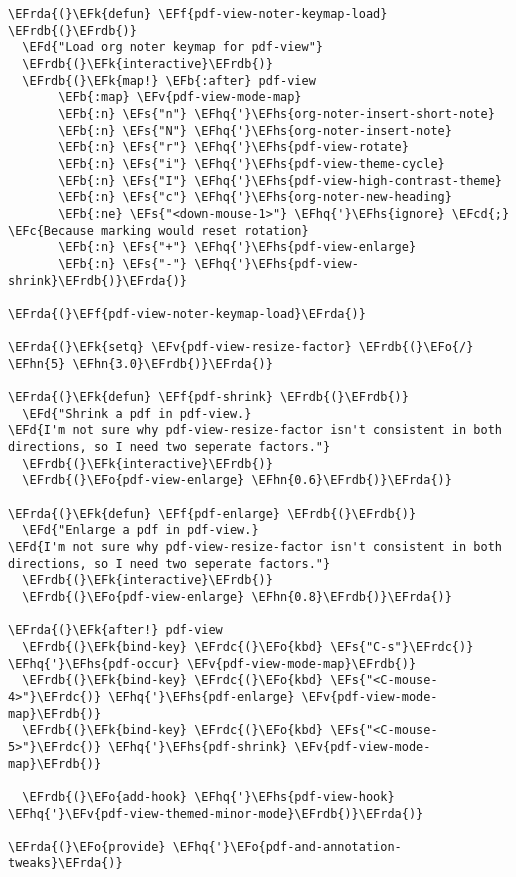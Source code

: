 \documentclass[a4wide,10pt]{article}
\newcommand{\EFc}[1]{\textcolor{EFc}{#1}} %
\newcommand{\EFcd}[1]{\textcolor{EFcd}{#1}} %
\newcommand{\EFs}[1]{\textcolor{EFs}{#1}} %
\newcommand{\EFd}[1]{\textcolor{EFd}{#1}} %
\newcommand{\EFk}[1]{\textcolor{EFk}{#1}} %
\newcommand{\EFb}[1]{\textcolor{EFb}{#1}} %
\newcommand{\EFf}[1]{\textcolor{EFf}{#1}} %
\newcommand{\EFv}[1]{\textcolor{EFv}{#1}} %
\newcommand{\EFo}[1]{\textcolor{EFo}{#1}} %
\newcommand{\EFhn}[1]{\textcolor{EFhn}{\textbf{#1}}} %
\newcommand{\EFhq}[1]{\textcolor{EFhq}{#1}} %
\newcommand{\EFhs}[1]{\textcolor{EFhs}{#1}} %
\newcommand{\EFrda}[1]{\textcolor{EFrda}{#1}} %
\newcommand{\EFrdb}[1]{\textcolor{EFrdb}{#1}} %
\newcommand{\EFrdc}[1]{\textcolor{EFrdc}{#1}} %
\begin{document}
\begin{Code}
\begin{Verbatim}
\EFrda{(}\EFk{defun} \EFf{pdf-view-noter-keymap-load} \EFrdb{(}\EFrdb{)}
  \EFd{"Load org noter keymap for pdf-view"}
  \EFrdb{(}\EFk{interactive}\EFrdb{)}
  \EFrdb{(}\EFk{map!} \EFb{:after} pdf-view
       \EFb{:map} \EFv{pdf-view-mode-map}
       \EFb{:n} \EFs{"n"} \EFhq{'}\EFhs{org-noter-insert-short-note}
       \EFb{:n} \EFs{"N"} \EFhq{'}\EFhs{org-noter-insert-note}
       \EFb{:n} \EFs{"r"} \EFhq{'}\EFhs{pdf-view-rotate}
       \EFb{:n} \EFs{"i"} \EFhq{'}\EFhs{pdf-view-theme-cycle}
       \EFb{:n} \EFs{"I"} \EFhq{'}\EFhs{pdf-view-high-contrast-theme}
       \EFb{:n} \EFs{"c"} \EFhq{'}\EFhs{org-noter-new-heading}
       \EFb{:ne} \EFs{"<down-mouse-1>"} \EFhq{'}\EFhs{ignore} \EFcd{;} \EFc{Because marking would reset rotation}
       \EFb{:n} \EFs{"+"} \EFhq{'}\EFhs{pdf-view-enlarge}
       \EFb{:n} \EFs{"-"} \EFhq{'}\EFhs{pdf-view-shrink}\EFrdb{)}\EFrda{)}

\EFrda{(}\EFf{pdf-view-noter-keymap-load}\EFrda{)}

\EFrda{(}\EFk{setq} \EFv{pdf-view-resize-factor} \EFrdb{(}\EFo{/} \EFhn{5} \EFhn{3.0}\EFrdb{)}\EFrda{)}

\EFrda{(}\EFk{defun} \EFf{pdf-shrink} \EFrdb{(}\EFrdb{)}
  \EFd{"Shrink a pdf in pdf-view.}
\EFd{I'm not sure why pdf-view-resize-factor isn't consistent in both directions, so I need two seperate factors."}
  \EFrdb{(}\EFk{interactive}\EFrdb{)}
  \EFrdb{(}\EFo{pdf-view-enlarge} \EFhn{0.6}\EFrdb{)}\EFrda{)}

\EFrda{(}\EFk{defun} \EFf{pdf-enlarge} \EFrdb{(}\EFrdb{)}
  \EFd{"Enlarge a pdf in pdf-view.}
\EFd{I'm not sure why pdf-view-resize-factor isn't consistent in both directions, so I need two seperate factors."}
  \EFrdb{(}\EFk{interactive}\EFrdb{)}
  \EFrdb{(}\EFo{pdf-view-enlarge} \EFhn{0.8}\EFrdb{)}\EFrda{)}

\EFrda{(}\EFk{after!} pdf-view
  \EFrdb{(}\EFk{bind-key} \EFrdc{(}\EFo{kbd} \EFs{"C-s"}\EFrdc{)} \EFhq{'}\EFhs{pdf-occur} \EFv{pdf-view-mode-map}\EFrdb{)}
  \EFrdb{(}\EFk{bind-key} \EFrdc{(}\EFo{kbd} \EFs{"<C-mouse-4>"}\EFrdc{)} \EFhq{'}\EFhs{pdf-enlarge} \EFv{pdf-view-mode-map}\EFrdb{)}
  \EFrdb{(}\EFk{bind-key} \EFrdc{(}\EFo{kbd} \EFs{"<C-mouse-5>"}\EFrdc{)} \EFhq{'}\EFhs{pdf-shrink} \EFv{pdf-view-mode-map}\EFrdb{)}

  \EFrdb{(}\EFo{add-hook} \EFhq{'}\EFhs{pdf-view-hook} \EFhq{'}\EFv{pdf-view-themed-minor-mode}\EFrdb{)}\EFrda{)}

\EFrda{(}\EFo{provide} \EFhq{'}\EFo{pdf-and-annotation-tweaks}\EFrda{)}
\end{Verbatim}
\end{Code}
\end{document}
